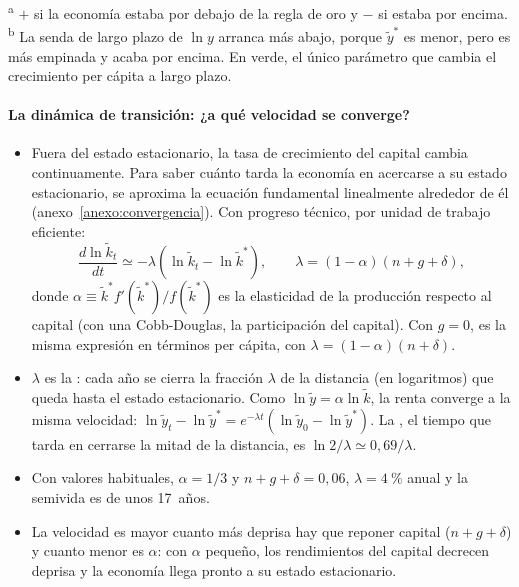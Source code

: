 \documentclass[11pt]{article}
\begin{document}
\begin{anotaciones}
\begin{tablacaja}
\smallskip
{\footnotesize \textsuperscript{a} $+$ si la economía estaba por debajo de la regla de oro y $-$ si estaba por encima. \textsuperscript{b} La senda de largo plazo de $\ln y$ arranca más abajo, porque $\tilde y^*$ es menor, pero es más empinada y acaba por encima. En verde, el único parámetro que cambia el crecimiento per cápita a largo plazo.}
\end{tablacaja}
\end{anotaciones}

\paragraph{La dinámica de transición: ¿a qué velocidad se converge?}

\begin{itemize}
\item Fuera del estado estacionario, la tasa de crecimiento del capital cambia continuamente. Para saber cuánto tarda la economía en acercarse a su estado estacionario, se aproxima la ecuación fundamental linealmente alrededor de él (anexo~\ref{anexo:convergencia}). Con progreso técnico, por unidad de trabajo eficiente:
  \begin{equation}
  \frac{d\ln\tilde k_t}{dt}\simeq-\lambda\left(\ln\tilde k_t-\ln\tilde k^*\right),\qquad \lambda=(1-\alpha)(n+g+\delta),\label{eq:velocidad}
  \end{equation}
  donde $\alpha\equiv\tilde k^*f'(\tilde k^*)/f(\tilde k^*)$ es la elasticidad de la producción respecto al capital (con una Cobb-Douglas, la participación del capital). Con $g=0$, es la misma expresión en términos per cápita, con $\lambda=(1-\alpha)(n+\delta)$.
\item $\lambda$ es la : cada año se cierra la fracción $\lambda$ de la distancia (en logaritmos) que queda hasta el estado estacionario. Como $\ln\tilde y=\alpha\ln\tilde k$, la renta converge a la misma velocidad: $\ln\tilde y_t-\ln\tilde y^*=e^{-\lambda t}(\ln\tilde y_0-\ln\tilde y^*)$. La , el tiempo que tarda en cerrarse la mitad de la distancia, es $\ln2/\lambda\simeq0{,}69/\lambda$.
\item Con valores habituales, $\alpha=1/3$ y $n+g+\delta=0{,}06$, $\lambda=4~\%$ anual y la semivida es de unos 17~años.
\item La velocidad es mayor cuanto más deprisa hay que reponer capital ($n+g+\delta$) y cuanto menor es $\alpha$: con $\alpha$ pequeño, los rendimientos del capital decrecen deprisa y la economía llega pronto a su estado estacionario.
\end{itemize}
\end{document}
